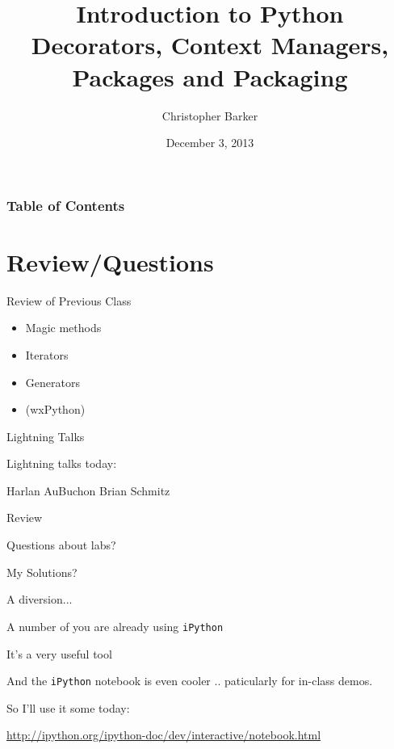 \documentclass{beamer}
\title[Intro to Python: Week 9]{Introduction  to Python\\ 
Decorators, Context Managers, \\
Packages and Packaging}
\author{Christopher Barker}
\institute{UW Continuing Education}
\date{December 3, 2013}
\begin{document}
\begin{frame}
  \titlepage
\end{frame}

\begin{frame}
\frametitle{Table of Contents}
  \tableofcontents
\end{frame}


\section{Review/Questions}

\begin{frame}{Review of Previous Class}

\begin{itemize}
  \item Magic methods
  \item Iterators
  \item Generators
  \item (wxPython)
\end{itemize}

\end{frame}


\begin{frame}{Lightning Talks}

\vfill
{\LARGE Lightning talks today:}

\vfill
{\Large

\vfill
 Harlan AuBuchon
\vfill
 Brian Schmitz
\vfill

}
\vfill

\end{frame}


\begin{frame}{Review}

  \vfill
  {\Large Questions about labs? }

  \vfill
  {\Large My Solutions? }

  \vfill

\end{frame}

\begin{frame}[fragile]{A diversion...}

\Large{A number of you are already using \verb|iPython|}

\vfill
\Large{It's a very useful tool}

\vfill
\Large{And the \verb|iPython| notebook is even cooler .. paticularly for in-class demos.}

\vfill
\Large{So I'll use it some today:}

\vfill
\url{http://ipython.org/ipython-doc/dev/interactive/notebook.html}


\end{frame}
\end{document}
